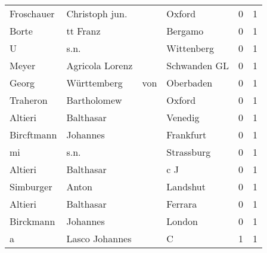 \begin{tabular}{llllrr}
               Froschauer &                     Christoph jun. &             &                                      Oxford &          0 &         1 \\
                    Borte &                           tt Franz &             &                                     Bergamo &          0 &         1 \\
                        U &                               s.n. &             &                                  Wittenberg &          0 &         1 \\
                    Meyer &                    Agricola Lorenz &             &                                Schwanden GL &          0 &         1 \\
                    Georg &                        Württemberg &         von &                                   Oberbaden &          0 &         1 \\
                 Traheron &                        Bartholomew &             &                                      Oxford &          0 &         1 \\
                  Altieri &                          Balthasar &             &                                     Venedig &          0 &         1 \\
               Bircftmann &                           Johannes &             &                                   Frankfurt &          0 &         1 \\
                       mi &                               s.n. &             &                                  Strassburg &          0 &         1 \\
                  Altieri &                          Balthasar &             &                                         c J &          0 &         1 \\
                Simburger &                              Anton &             &                                    Landshut &          0 &         1 \\
                  Altieri &                          Balthasar &             &                                     Ferrara &          0 &         1 \\
                Birckmann &                           Johannes &             &                                      London &          0 &         1 \\
                        a &                     Lasco Johannes &             &                                           C &          1 &         1 \\

\end{tabular}
